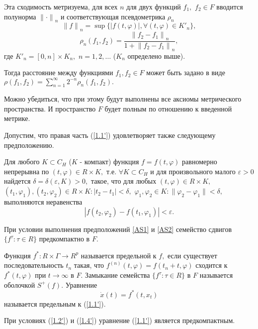 	Эта сходимость метризуема, для всех $n$ для двух функций $f_1,$
	$f_2\in F$ вводится полунорма ${\|\cdot \|}_n$ и соответствующая
	псевдометрика $\rho _n$  $${\| f\|
	}_n=\sup{\{|f(t,\varphi )|, \forall (t,\varphi )\in {K'}_n\} },$$
	$$\rho _n(f_1,f_2)=\frac{{\| f_2-f_1\| }_n}{1+{\| f_2-f_1\|
		}_n},$$ \noindent где ${K'}_n=[0,n]\times K_n,$ $n=1,2,\ldots $
	($K_n$ определено выше).
	
	Тогда расстояние между функциями $f_1, f_2\in F$ может быть задано в виде
	$\rho (f_1,f_2)=\sum_{n=1}^{\infty }{2^{-n}\rho _n(f_1,f_2)}.
	\label{1.3'}$
	
	Можно убедиться, что при этому будут выполнены все аксиомы
	метрического пространства. И пространство
	$F$ будет полным по отношению к введенной метрике.
	
	Допустим,  что правая  часть   (\ref{1.1'})   удовлетворяет   также
	следующему предположению.
	
	\begin{Ass}\label{AS2} Для любого $K\subset C_H$ ($K$ - компакт)
		функция $f=f(t,\varphi )$ равномерно непрерывна по
		$(t, \varphi )\in R\times K,$ т.е. $\forall K\subset C_H$ и для произвольного малого $\varepsilon
		>0$ найдется $\delta =\delta (\varepsilon ,K)>0,$ такое, что для
		любых $(t,\varphi)\in R\times K,$ $(t_1,\varphi _1),
		(t_2,\varphi _2)\in R\times K: |t_2-t_1|<\delta,$ $\varphi _1,
		\varphi _2\in K:\|\varphi _2-\varphi _1\|<\delta,$ выполняются
		неравенства
		\begin{equation}
		|f(t_2,\varphi _2)-f(t_1,\varphi
		_1)|<\varepsilon. \label{1.4'}
		\end{equation}
	\end{Ass}
	
	\begin{Lemm}\label{l-1.3} При условии выполнения предположений \ref{AS1} и \ref{AS2}
		семейство сдвигов $\{f^{\tau }:\tau\in R\}$
		предкомпактно в $F.$
	\end{Lemm}
	
	\begin{Def}\label{d-1.1} Функция $f^*:R\times\Gamma \to R^p$ называется предельной
		к $f,$ если существует  последовательность ${t_n}$
		такая,  что ${f^{(n)}(t,\varphi )=f(t_n+t,\varphi )}$ сходится к
		$f^*(t,\varphi )$ при $t \to \infty$ в $F.$ Замыкание семейства $\{f^{\tau }:\tau \in
		R\}$ в $F$ называется оболочкой $S^+(f).$ Уравнение
		\begin{equation}
		\dot x(t)=f^*(t,x_t) \label{1.5'}
		\end{equation}
		называется предельным к (\ref{1.1'}).
	\end{Def}
	При  условиях (\ref{1.2'}) и (\ref{1.4'})
	уравнение  (\ref{1.1'}) является предкомпактным.
	

